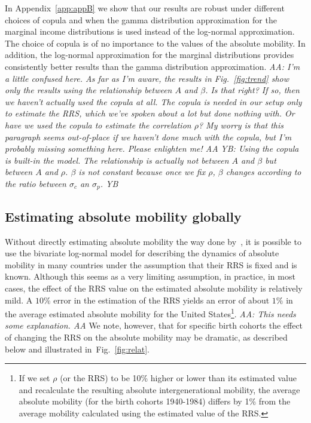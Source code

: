 \documentclass[12pt,a4paper]{article}
\newcommand{\red}[1]{{\color{red} #1}}
\newcommand{\blue}[1]{{\color{blue} #1}}
\newcommand{\AAA}[1]{\red{{\it AA: #1 AA}}}
\newcommand{\YB}[1]{\blue{{\it YB: #1 YB}}}
\newcommand{\fref}[1]{Fig.~\ref{fig:#1}}
\numberwithin{equation}{section}
\begin{document}
In Appendix~\ref{app:appB} we show that our results are robust under different choices of copula and when the gamma distribution approximation for the marginal income distributions is used instead of the log-normal approximation. The choice of copula is of no importance to the values of the absolute mobility. In addition, the log-normal approximation for the marginal distributions provides consistently better results than the gamma distribution approximation. \AAA{I'm a little confused here. As far as I'm aware, the results in \fref{trend} show only the results using the relationship between $A$ and $\beta$. Is that right? If so, then we haven't actually used the copula at all. The copula is needed in our setup only to estimate the RRS, which we've spoken about a lot but done nothing with. Or have we used the copula to estimate the correlation $\rho$? My worry is that this paragraph seems out-of-place if we haven't done much with the copula, but I'm probably missing something here. Please enlighten me!} \YB{Using the copula is built-in the model. The relationship is actually not between $A$ and $\beta$ but between $A$ and $\rho$. $\beta$ is not constant because once we fix $\rho$, $\beta$ changes according to the ratio between $\sigma_c$ an $\sigma_p$.}

\subsection{Estimating absolute mobility globally}
\label{sec:global}

Without directly estimating absolute mobility the way done by~\citet{chetty2017fading}, it is possible to use the bivariate log-normal model for describing the dynamics of absolute mobility in many countries under the assumption that their RRS is fixed and is known. Although this seems as a very limiting assumption, in practice, in most cases, the effect of the RRS value on the estimated absolute mobility is relatively mild. A $10\%$ error in the estimation of the RRS yields an error of about $1\%$ in the average estimated absolute mobility for the United States\footnote{\label{foot1}If we set $\rho$ (or the RRS) to be 10\% higher or lower than its estimated value and recalculate the resulting absolute intergenerational mobility, the average absolute mobility (for the birth cohorts 1940-1984) differs by 1\% from the average mobility calculated using the estimated value of the RRS.}. \AAA{This needs some explanation.} We note, however, that for specific birth cohorts the effect of changing the RRS on the absolute mobility may be dramatic, as described below and illustrated in~\fref{relat}.
\end{document}
